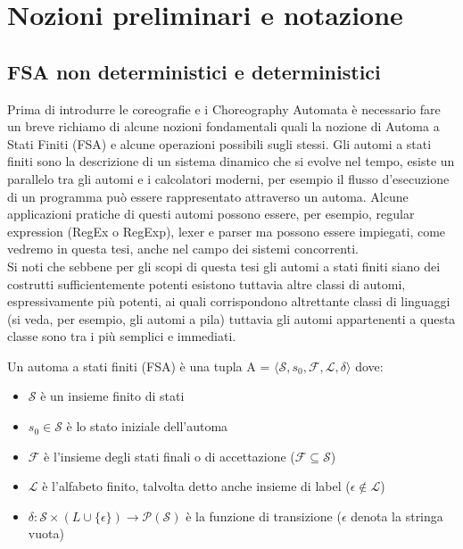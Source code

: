 \chapter{Nozioni preliminari e notazione}
\label{cap:Preliminaries}
\section{FSA non deterministici e deterministici}
Prima di introdurre le coreografie e i Choreography Automata è necessario fare un breve richiamo di alcune nozioni fondamentali quali la nozione di Automa a Stati Finiti (FSA)\cite{Linguaggi_di_Prorgammazione} e alcune operazioni possibili sugli stessi.
Gli automi a stati finiti sono la descrizione di un sistema dinamico che si evolve nel tempo, esiste un parallelo tra gli automi e i calcolatori moderni, per esempio il flusso d'esecuzione di un programma può essere rappresentato attraverso un automa.
Alcune applicazioni pratiche di questi automi possono essere, per esempio, regular expression (RegEx o RegExp), lexer e parser ma possono essere impiegati, come vedremo in questa tesi, anche nel campo dei sistemi concorrenti.\\
Si noti che sebbene per gli scopi di questa tesi gli automi a stati finiti siano dei costrutti sufficientemente potenti esistono tuttavia altre classi di automi, espressivamente più potenti, ai quali corrispondono altrettante classi di linguaggi (si veda, per esempio, gli automi a pila) tuttavia gli automi appartenenti a questa classe sono tra i più semplici e immediati.

\begin{definition}
    Un automa a stati finiti (FSA) è una tupla A = $\langle \mathcal{S}, s_0, \mathcal{F}, \mathcal{L}, \delta \rangle$ dove:
    \begin{itemize}
        \item $\mathcal{S}$ è un insieme finito di stati
        \item $s_0 \in \mathcal{S}$ è lo stato iniziale dell'automa
        \item $\mathcal{F}$ è l'insieme degli stati finali o di accettazione ($\mathcal{F} \subseteq \mathcal{S}$)
        \item $\mathcal{L}$ è l'alfabeto finito, talvolta detto anche insieme di label ($\epsilon \notin \mathcal{L}$)
        \item $\delta : \mathcal{S} \times (L \cup \{\epsilon\}) \rightarrow \mathcal{P}(\mathcal{S})$ è la funzione di transizione ($\epsilon$ denota la stringa vuota)
    \end{itemize}
\end{definition}


